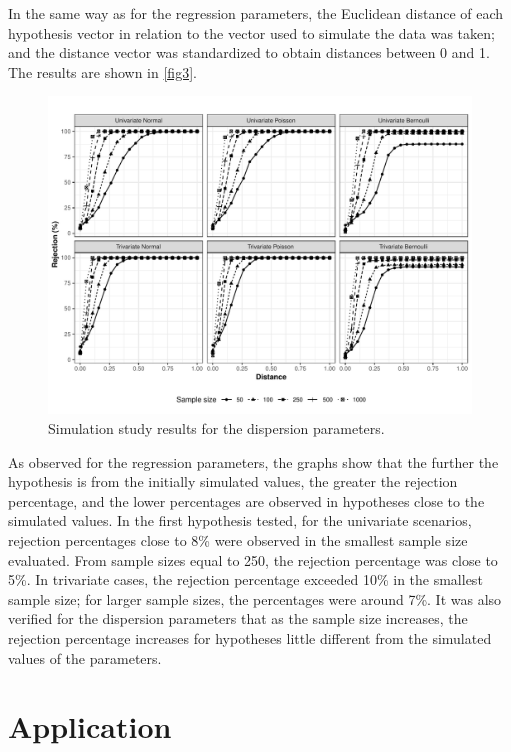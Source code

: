 \documentclass[AMA,STIX1COL]{WileyNJD-v2}
\begin{document}
In the same way as for the regression parameters, the Euclidean distance of each hypothesis vector in relation to the vector used to simulate the data was taken; and the distance vector was standardized to obtain distances between 0 and 1. The results are shown in \autoref{fig3}.

\begin{figure}[h]
\centerline{\includegraphics[scale = 0.9]{FIGURE3}}
\caption{Simulation study results for the dispersion parameters.\label{fig3}}
\end{figure}

As observed for the regression parameters, the graphs show that the further the hypothesis is from the initially simulated values, the greater the rejection percentage, and the lower percentages are observed in hypotheses close to the simulated values. In the first hypothesis tested, for the univariate scenarios, rejection percentages close to 8\% were observed in the smallest sample size evaluated. From sample sizes equal to 250, the rejection percentage was close to 5\%. In trivariate cases, the rejection percentage exceeded 10\% in the smallest sample size; for larger sample sizes, the percentages were around 7\%. It was also verified for the dispersion parameters that as the sample size increases, the rejection percentage increases for hypotheses little different from the simulated values of the parameters.


\section{Application}\label{sec6}
\end{document}
